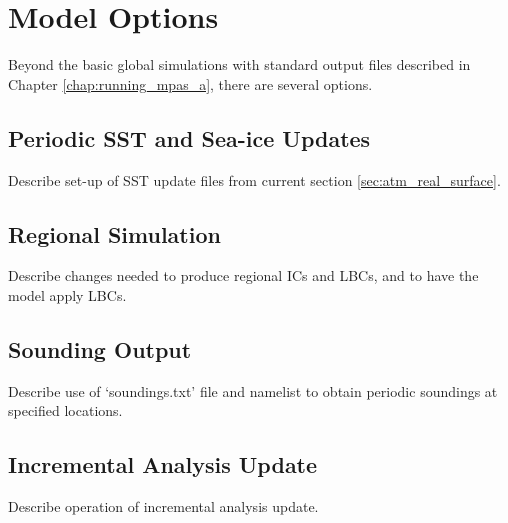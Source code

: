 \chapter{Model Options}
\label{chap:mpas_options}

Beyond the basic global simulations with standard output files described in Chapter \ref{chap:running_mpas_a}, there are
several options.


\section{Periodic SST and Sea-ice Updates}
\label{sec:sst_update}

Describe set-up of SST update files from current section \ref{sec:atm_real_surface}.


\section{Regional Simulation}
\label{sec:regional}

Describe changes needed to produce regional ICs and LBCs, and to have the model apply LBCs.


\section{Sounding Output}
\label{sec:soundings}

Describe use of `soundings.txt' file and namelist to obtain periodic soundings at specified locations.


\section{Incremental Analysis Update}
\label{sec:iau}

Describe operation of incremental analysis update.
